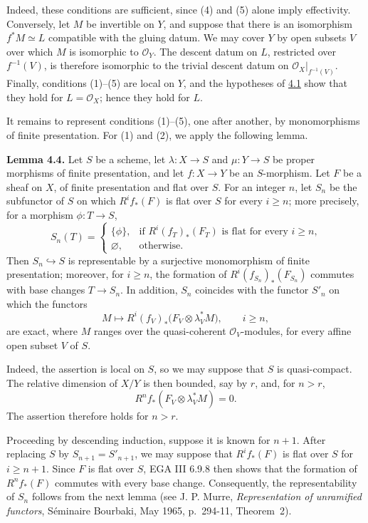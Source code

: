\newpage
Indeed, these conditions are sufficient, since (4) and (5) alone imply
effectivity. Conversely, let \(M\) be invertible on \(Y\), and suppose that
there is an isomorphism \(f^*M\simeq L\) compatible with the gluing datum. We
may cover \(Y\) by open subsets \(V\) over which \(M\) is isomorphic to
\(\mathcal O_Y\). The descent datum on \(L\), restricted over
\(f^{-1}(V)\), is therefore isomorphic to the trivial descent datum on
\(\mathcal O_X|_{f^{-1}(V)}\). Finally, conditions (1)--(5) are local on
\(Y\), and the hypotheses of \hyperlink{sga6.e12.prop.4-1}{4.1} show that they hold for
\(L=\mathcal O_X\); hence they hold for \(L\).

It remains to represent conditions (1)--(5), one after another, by
monomorphisms of finite presentation. For (1) and (2), we apply the following
lemma.

\textbf{Lemma 4.4.} Let \(S\) be a scheme, let
\(\lambda:X\to S\) and \(\mu:Y\to S\) be proper morphisms of finite
presentation, and let \(f:X\to Y\) be an \(S\)-morphism. Let \(F\) be a
sheaf on \(X\), of finite presentation and flat over \(S\). For an integer
\(n\), let \(S_n\) be the subfunctor of \(S\) on which \(R^if_*(F)\) is
flat over \(S\) for every \(i\geq n\); more precisely, for a morphism
\(\phi:T\to S\),
\[
  S_n(T)=
  \begin{cases}
    \{\phi\},&\text{if \(R^i(f_T)_*(F_T)\) is flat for every \(i\geq n\),}\\
    \varnothing,&\text{otherwise.}
  \end{cases}
\]
Then \(S_n\hookrightarrow S\) is representable by a surjective monomorphism
of finite presentation; moreover, for \(i\geq n\), the formation of
\(R^i(f_{S_n})_*(F_{S_n})\) commutes with base changes \(T\to S_n\). In
addition, \(S_n\) coincides with the functor \(S'_n\) on which the functors
\[
  M\longmapsto
  R^i(f_V)_*\bigl(F_V\otimes\lambda_V^*M\bigr),
  \qquad i\geq n,
\]
are exact, where \(M\) ranges over the quasi-coherent
\(\mathcal O_V\)-modules, for every affine open subset \(V\) of \(S\).

Indeed, the assertion is local on \(S\), so we may suppose that \(S\) is
quasi-compact. The relative dimension of \(X/Y\) is then bounded, say by
\(r\), and, for \(n>r\),
\[
  R^nf_*(F_V\otimes\lambda_V^*M)=0.
\]
The assertion therefore holds for \(n>r\).

\newpage
Proceeding by descending induction, suppose it is known for \(n+1\). After
replacing \(S\) by \(S_{n+1}=S'_{n+1}\), we may suppose that
\(R^if_*(F)\) is flat over \(S\) for \(i\geq n+1\). Since \(F\) is flat
over \(S\), EGA III 6.9.8 then shows that the formation of \(R^nf_*(F)\)
commutes with every base change. Consequently, the representability of
\(S_n\) follows from the next lemma (see J. P. Murre,
\emph{Representation of unramified functors}, S\'eminaire Bourbaki, May
1965, p.~294-11, Theorem~2).

